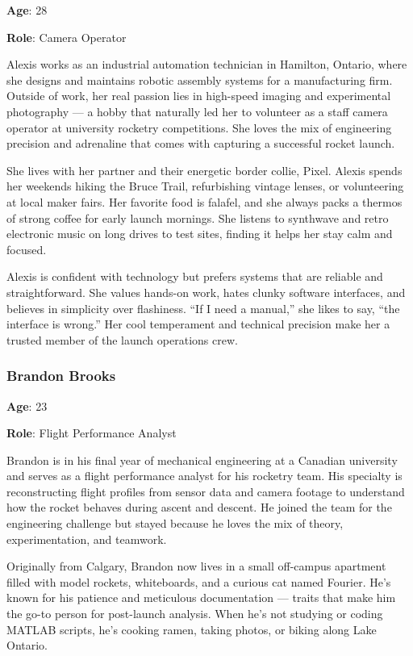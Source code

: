 \documentclass[12pt]{article}
\begin{document}
\textbf{Age}: 28

\textbf{Role}: Camera Operator

Alexis works as an industrial automation technician in Hamilton, Ontario, where
she designs and maintains robotic assembly systems for a manufacturing firm.
Outside of work, her real passion lies in high-speed imaging and experimental
photography — a hobby that naturally led her to volunteer as a staff camera
operator at university rocketry competitions. She loves the mix of engineering
precision and adrenaline that comes with capturing a successful rocket launch.

She lives with her partner and their energetic border collie, Pixel. Alexis
spends her weekends hiking the Bruce Trail, refurbishing vintage lenses, or
volunteering at local maker fairs. Her favorite food is falafel, and she always
packs a thermos of strong coffee for early launch mornings. She listens to
synthwave and retro electronic music on long drives to test sites, finding it
helps her stay calm and focused.

Alexis is confident with technology but prefers systems that are reliable and
straightforward. She values hands-on work, hates clunky software interfaces,
and believes in simplicity over flashiness. “If I need a manual,” she likes to
say, “the interface is wrong.” Her cool temperament and technical precision
make her a trusted member of the launch operations crew.

\subsubsection*{Brandon Brooks}

\textbf{Age}: 23

\textbf{Role}: Flight Performance Analyst

Brandon is in his final year of mechanical engineering at a Canadian university
and serves as a flight performance analyst for his rocketry team. His specialty
is reconstructing flight profiles from sensor data and camera footage to
understand how the rocket behaves during ascent and descent. He joined the team
for the engineering challenge but stayed because he loves the mix of theory,
experimentation, and teamwork.

Originally from Calgary, Brandon now lives in a small off-campus apartment
filled with model rockets, whiteboards, and a curious cat named Fourier. He's
known for his patience and meticulous documentation — traits that make him the
go-to person for post-launch analysis. When he's not studying or coding MATLAB
scripts, he's cooking ramen, taking photos, or biking along Lake Ontario.
\end{document}
